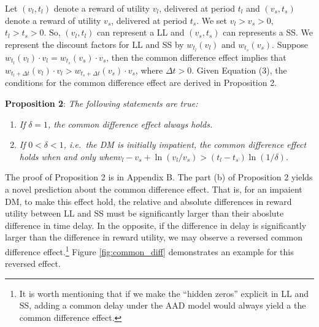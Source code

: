 \documentclass[
  12pt,
]{article}
\begin{document}
Let \((v_l,t_l)\) denote a reward of utility \(v_l\), delivered at
period \(t_l\) and \((v_s,t_s)\) denote a reward of utility \(v_s\),
delivered at period \(t_s\). We set \(v_l>v_s>0\), \(t_l>t_s>0\). So,
\((v_l,t_l)\) can represent a LL and \((v_s,t_s)\) can represents a SS.
We represent the discount factors for LL and SS by \(w_{t_l}(v_l)\) and
\(w_{t_s}(v_s)\). Suppose
\(w_{t_l}(v_l)\cdot v_l = w_{t_s}(v_s)\cdot v_s\), then the common
difference effect implies that
\(w_{t_l+\Delta t}(v_l)\cdot v_l > w_{t_s+\Delta t}(v_s)\cdot v_s\),
where \(\Delta t >0\). Given Equation (3), the conditions for the common
difference effect are derived in Proposition 2.

\noindent \textbf{Proposition 2}: \emph{The following statements are
true:}

\begin{enumerate}
\def\labelenumi{(\alph{enumi})}
\item
  \emph{If} \(\delta=1\)\emph{, the common difference effect always
  holds.}
\item
  \emph{If} \(0<\delta<1\)\emph{, i.e.~the DM is initially impatient,
  the common difference effect holds when and only
  when}\(v_l-v_s+\ln(v_l/v_s)>(t_l-t_s)\ln(1/\delta)\)\emph{.}
\end{enumerate}

The proof of Proposition 2 is in Appendix B. The part (b) of Proposition
2 yields a novel prediction about the common difference effect. That is,
for an impaient DM, to make this effect hold, the relative and absolute
differences in reward utility between LL and SS must be significantly
larger than their aboslute difference in time delay. In the opposite, if
the difference in delay is significantly larger than the difference in
reward utility, we may observe a reversed common difference
effect.\footnote{It is worth mentioning that if we make the ``hidden
  zeros'' explicit in LL and SS, adding a common delay under the AAD
  model would always yield a the common difference effect.} Figure
\ref{fig:common_diff} demonstrates an example for this reversed effect.
\end{document}
